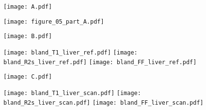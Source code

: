 \documentclass[preview]{standalone}
\begin{document}
\begin{figure}
	\centering
	\begin{minipage}{.03\textwidth}
		\texttt{[image: A.pdf]}\vspace*{6cm}
	\end{minipage}
	\hfill %
	\begin{minipage}{.96\textwidth}
		\texttt{[image: figure\_05\_part\_A.pdf]}
	\end{minipage}%

	\vspace*{0.2cm}

	\begin{minipage}{.03\textwidth}
		\texttt{[image: B.pdf]}\vspace*{2.7cm}
	\end{minipage}
	\hfill %
	\begin{minipage}{.96\textwidth}
		\texttt{[image: bland\_T1\_liver\_ref.pdf]}\hspace*{0.2cm}
		\texttt{[image: bland\_R2s\_liver\_ref.pdf]}\hspace*{0.2cm}
		\texttt{[image: bland\_FF\_liver\_ref.pdf]}
	\end{minipage}%

	\begin{minipage}{.03\textwidth}
		\texttt{[image: C.pdf]}\vspace*{2.7cm}
	\end{minipage}
	\hfill %
	\begin{minipage}{.96\textwidth}
		\texttt{[image: bland\_T1\_liver\_scan.pdf]}\hspace*{0.2cm}
		\texttt{[image: bland\_R2s\_liver\_scan.pdf]}\hspace*{0.2cm}
		\texttt{[image: bland\_FF\_liver\_scan.pdf]}
	\end{minipage}%

\end{figure}
\end{document}
